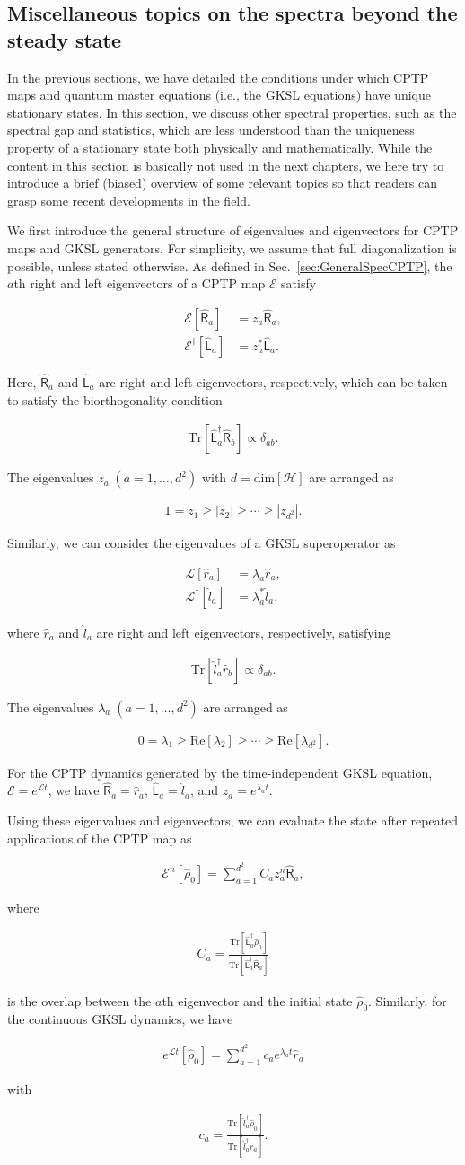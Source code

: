 \documentclass[preprint,pteplogo]{ptephy_v2}%
\numberwithin{equation}{section}
\theoremstyle{definition}
\newcommand{\ml}[1]{\mathcal{#1}}
\newcommand{\mr}[1]{\mathrm{#1}}
\newcommand{\aln}[1]{
\begin{align}
#1
\end{align}
}
\newcommand{\Tr}{\mr{Tr}}
\begin{document}
\subsection{Miscellaneous topics on the spectra beyond the steady state}
\label{sec:miscellaneous}

In the previous sections, we have detailed the conditions under which CPTP maps and quantum master equations (i.e., the GKSL equations) have unique stationary states. 
In this section, we discuss other spectral properties, such as the spectral gap and statistics, which are less understood than the uniqueness property of a stationary state both physically and mathematically.
While the content in this section is basically not used in the next chapters, we here try to introduce a brief (biased) overview of some relevant topics so that readers can grasp some recent developments in the field. 

We first introduce the general structure of eigenvalues and eigenvectors for CPTP maps and GKSL generators.
For simplicity, we assume that full diagonalization is possible, unless stated otherwise.
As defined in Sec.~\ref{sec:GeneralSpecCPTP}, the $a$th right and left eigenvectors of a CPTP map $\ml{E}$ satisfy
\aln{
\ml{E}[\hat{\mathsf{R}}_a]&=z_a\hat{ \mathsf{R}}_a,\\
\ml{E}^\dag[\hat{\mathsf{L}}_a]&=z_a^*\hat{\mathsf{L}}_a.
}
Here, $\hat{\mathsf{R}}_a$ and $\hat{\mathsf{L}}_a$ are right and left eigenvectors, respectively, which can be taken to satisfy the biorthogonality condition
\aln{
\Tr[\hat{\mathsf{L}}_a^\dag \hat{\mathsf{R}}_b]\propto\delta_{ab}.
}
The eigenvalues $z_a\;(a=1,\ldots, d^2)$ with $d=\mathrm{dim}[\ml{H}]$ are arranged as
\aln{
1=z_1\geq |z_2|\geq\cdots \geq|z_{d^2}|.
}
Similarly, we can consider the eigenvalues of a GKSL superoperator as
\aln{
\ml{L}[\hat{r}_a]&=\lambda_a\hat{ r}_a,\\
\ml{L}^\dag[\hat{l}_a]&=\lambda_a^*\hat{l}_a,
}
where $\hat{{r}}_a$ and $\hat{{l}}_a$ are right and left eigenvectors, respectively, satisfying
\aln{
\Tr[\hat{l}_a^\dag \hat{r}_b]\propto\delta_{ab}.
}
The eigenvalues $\lambda_a\;(a=1,\ldots, d^2)$ are arranged as
\aln{
0=\lambda_1\geq \mr{Re}[\lambda_2]\geq \cdots \geq \mr{Re}[\lambda_{d^2}].
}
For the CPTP dynamics generated by the time-independent GKSL equation, $\ml{E}=e^{\ml{L}t}$, we have $\hat{\mathsf{R}}_a=\hat{r}_a$, $\hat{\mathsf{L}}_a=\hat{l}_a$, and $z_a=e^{\lambda_a t}$.

Using these eigenvalues and eigenvectors, we can evaluate the state after repeated applications of the CPTP map as 
\aln{\label{sddcptp}
\ml{E}^n[\hat{\rho}_0]=\sum_{a=1}^{d^2}C_az_a^n\hat{\mathsf{R}}_a,
}
where
\aln{\label{cacptp}
C_a=\frac{\Tr[\hat{\mathsf{L}}_a^\dag\hat{\rho}_0]}{\Tr[\hat{\mathsf{L}}_a^\dag\hat{\mathsf{R}}_a]}
}
is the overlap between the $a$th eigenvector and the initial state $\hat{\rho}_0$.
Similarly, for the continuous GKSL dynamics, we have
\aln{
e^{\ml{L}t}[\hat{\rho}_0]=\sum_{a=1}^{d^2}c_ae^{\lambda_at}\hat{r}_a
}
with 
\aln{\label{cadef}
c_a=\frac{\Tr[\hat{l}_a^\dag\hat{\rho}_0]}{\Tr[\hat{l}_a^\dag\hat{r}_a]}.
}
\end{document}
